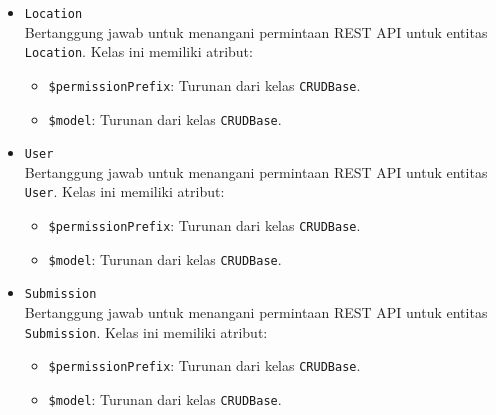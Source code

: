 \begin{itemize}
        \item \texttt{Location}\\
            Bertanggung jawab untuk menangani permintaan REST API untuk entitas
            \texttt{Location}. Kelas ini memiliki atribut:
            \begin{itemize}
                \item \texttt{\$permissionPrefix}: Turunan dari kelas
                \texttt{CRUDBase}.
                \item \texttt{\$model}: Turunan dari kelas \texttt{CRUDBase}.
            \end{itemize}
        
        \item \texttt{User}\\
            Bertanggung jawab untuk menangani permintaan REST API untuk entitas
            \texttt{User}. Kelas ini memiliki atribut:
            \begin{itemize}
                \item \texttt{\$permissionPrefix}: Turunan dari kelas
                \texttt{CRUDBase}.
                \item \texttt{\$model}: Turunan dari kelas \texttt{CRUDBase}.
            \end{itemize}
        
        \item \texttt{Submission}\\
            Bertanggung jawab untuk menangani permintaan REST API untuk entitas
            \texttt{Submission}. Kelas ini memiliki atribut:
            \begin{itemize}
                \item \texttt{\$permissionPrefix}: Turunan dari kelas
                \texttt{CRUDBase}.
                \item \texttt{\$model}: Turunan dari kelas \texttt{CRUDBase}.
            \end{itemize}
        

\end{itemize}
